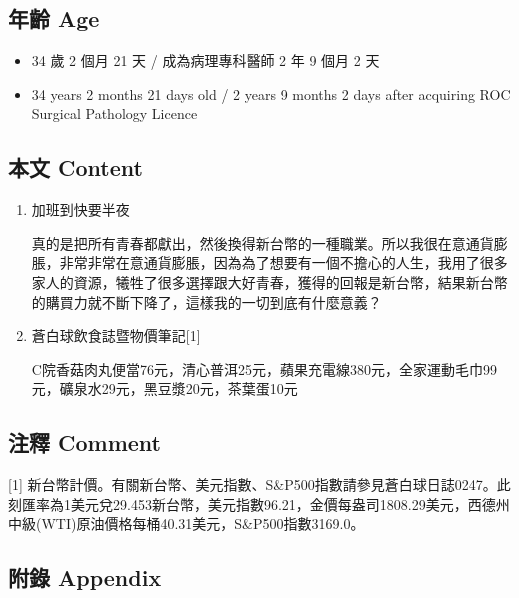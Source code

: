 \documentclass[a5paper, 11pt
]{book}
\providecommand{\tightlist}{%
  \setlength{\itemsep}{0pt}\setlength{\parskip}{0pt}}
\begin{document}
\hypertarget{ux5e74ux9f61-age-38}{%
\subsection{年齡 Age}\label{ux5e74ux9f61-age-38}}

\begin{itemize}
\tightlist
\item
  34 歲 2 個月 21 天 / 成為病理專科醫師 2 年 9 個月 2 天
\item
  34 years 2 months 21 days old / 2 years 9 months 2 days after
  acquiring ROC Surgical Pathology Licence
\end{itemize}

\hypertarget{ux672cux6587-content-38}{%
\subsection{本文 Content}\label{ux672cux6587-content-38}}

\begin{enumerate}
\def\labelenumi{\arabic{enumi}.}
\item
  加班到快要半夜

  真的是把所有青春都獻出，然後換得新台幣的一種職業。所以我很在意通貨膨脹，非常非常在意通貨膨脹，因為為了想要有一個不擔心的人生，我用了很多家人的資源，犧牲了很多選擇跟大好青春，獲得的回報是新台幣，結果新台幣的購買力就不斷下降了，這樣我的一切到底有什麼意義？
\item
  蒼白球飲食誌暨物價筆記{[}1{]}

  C院香菇肉丸便當76元，清心普洱25元，蘋果充電線380元，全家運動毛巾99元，礦泉水29元，黑豆漿20元，茶葉蛋10元
\end{enumerate}

\hypertarget{ux6ce8ux91cb-comment-38}{%
\subsection{注釋 Comment}\label{ux6ce8ux91cb-comment-38}}

{[}1{]}
新台幣計價。有關新台幣、美元指數、S\&P500指數請參見蒼白球日誌0247。此刻匯率為1美元兌29.453新台幣，美元指數96.21，金價每盎司1808.29美元，西德州中級(WTI)原油價格每桶40.31美元，S\&P500指數3169.0。

\hypertarget{ux9644ux9304-appendix-38}{%
\subsection{附錄 Appendix}\label{ux9644ux9304-appendix-38}}
\end{document}
